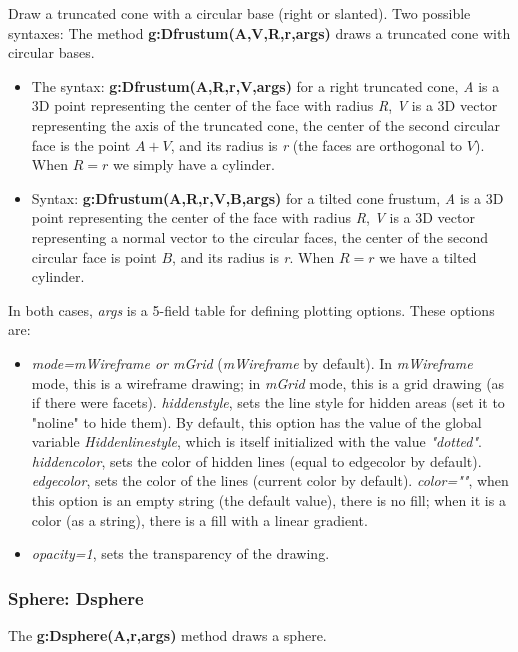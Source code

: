 Draw a truncated cone with a circular base (right or slanted). Two possible syntaxes:
The method \textbf{g:Dfrustum(A,V,R,r,args)} draws a truncated cone with circular bases.

\begin{itemize}
    \item The syntax: \textbf{g:Dfrustum(A,R,r,V,args)} for a right truncated cone, \emph{A} is a 3D point representing the center of the face with radius \emph{R}, \emph{V} is a 3D vector representing the axis of the truncated cone, the center of the second circular face is the point $A+V$, and its radius is \emph{r} (the faces are orthogonal to $V$). When $R=r$ we simply have a cylinder.
    \item Syntax: \textbf{g:Dfrustum(A,R,r,V,B,args)} for a tilted cone frustum, \emph{A} is a 3D point representing the center of the face with radius \emph{R}, \emph{V} is a 3D vector representing a normal vector to the circular faces, the center of the second circular face is point $B$, and its radius is \emph{r}. When $R=r$ we have a tilted cylinder.
\end{itemize}
In both cases, \emph{args} is a 5-field table for defining plotting options. These options are:
\begin{itemize}
    \item \emph{mode=mWireframe or mGrid} (\emph{mWireframe} by default). In \emph{mWireframe} mode, this is a wireframe drawing; in \emph{mGrid} mode, this is a grid drawing (as if there were facets).
\emph{hiddenstyle}, sets the line style for hidden areas (set it to "noline" to hide them). By default, this option has the value of the global variable \emph{Hiddenlinestyle}, which is itself initialized with the value \emph{"dotted"}.
\emph{hiddencolor}, sets the color of hidden lines (equal to edgecolor by default).
\emph{edgecolor}, sets the color of the lines (current color by default).
\emph{color=""}, when this option is an empty string (the default value), there is no fill; when it is a color (as a string), there is a fill with a linear gradient.
    \item \emph{opacity=1}, sets the transparency of the drawing.
\end{itemize}


\subsubsection{ Sphere: Dsphere}

The \textbf{g:Dsphere(A,r,args)} method draws a sphere.

